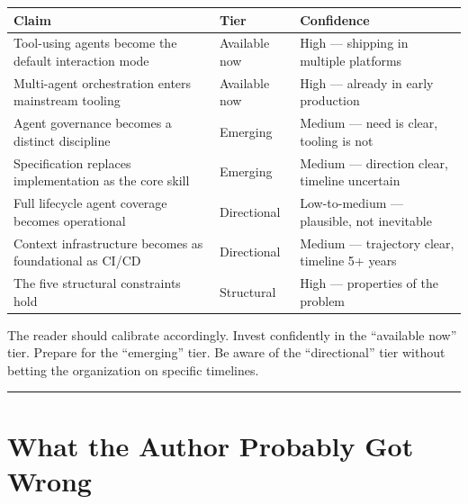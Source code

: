 \documentclass[
  a4paper,
  DIV=11,
  numbers=noendperiod]{scrreprt}
\newcounter{none} %
\begin{document}
{\def\LTcaptype{none} %
\begin{longtable}[]{@{}
  >{\raggedright\arraybackslash}p{}
  >{\raggedright\arraybackslash}p{}
  >{\raggedright\arraybackslash}p{}@{}}
\toprule\noalign{}
\begin{minipage}[b]{\linewidth}\raggedright
Claim
\end{minipage} & \begin{minipage}[b]{\linewidth}\raggedright
Tier
\end{minipage} & \begin{minipage}[b]{\linewidth}\raggedright
Confidence
\end{minipage} \\
\midrule\noalign{}
\endhead
\bottomrule\noalign{}
\endlastfoot
Tool-using agents become the default interaction mode & Available now &
High --- shipping in multiple platforms \\
Multi-agent orchestration enters mainstream tooling & Available now &
High --- already in early production \\
Agent governance becomes a distinct discipline & Emerging & Medium ---
need is clear, tooling is not \\
Specification replaces implementation as the core skill & Emerging &
Medium --- direction clear, timeline uncertain \\
Full lifecycle agent coverage becomes operational & Directional &
Low-to-medium --- plausible, not inevitable \\
Context infrastructure becomes as foundational as CI/CD & Directional &
Medium --- trajectory clear, timeline 5+ years \\
The five structural constraints hold & Structural & High --- properties
of the problem \\
\end{longtable}
}

The reader should calibrate accordingly. Invest confidently in the
``available now'' tier. Prepare for the ``emerging'' tier. Be aware of
the ``directional'' tier without betting the organization on specific
timelines.

\begin{center}\rule{0.5\linewidth}{0.5pt}\end{center}

\section{What the Author Probably Got
Wrong}\label{what-the-author-probably-got-wrong}
\end{document}
